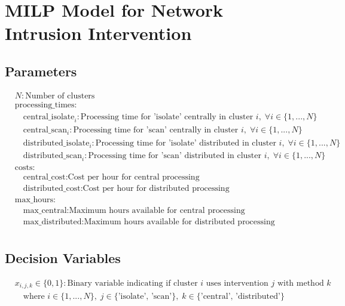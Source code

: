 \documentclass{article}
\begin{document}
\section*{MILP Model for Network Intrusion Intervention}

\subsection*{Parameters}
\begin{align*}
    &N: \text{Number of clusters} \\
    &\text{processing\_times:}\\
    &\quad \text{central\_isolate}_i: \text{Processing time for 'isolate' centrally in cluster } i, \; \forall i \in \{1, ..., N\} \\
    &\quad \text{central\_scan}_i: \text{Processing time for 'scan' centrally in cluster } i, \; \forall i \in \{1, ..., N\} \\
    &\quad \text{distributed\_isolate}_i: \text{Processing time for 'isolate' distributed in cluster } i, \; \forall i \in \{1, ..., N\} \\
    &\quad \text{distributed\_scan}_i: \text{Processing time for 'scan' distributed in cluster } i, \; \forall i \in \{1, ..., N\} \\
    &\text{costs:}\\
    &\quad \text{central\_cost}: \text{Cost per hour for central processing} \\
    &\quad \text{distributed\_cost}: \text{Cost per hour for distributed processing} \\
    &\text{max\_hours:}\\
    &\quad \text{max\_central}: \text{Maximum hours available for central processing} \\
    &\quad \text{max\_distributed}: \text{Maximum hours available for distributed processing} \\
\end{align*}

\subsection*{Decision Variables}
\begin{align*}
    &x_{i,j,k} \in \{0, 1\}: \text{Binary variable indicating if cluster } i \text{ uses intervention } j \text{ with method } k \\
    &\quad \text{where } i \in \{1, ..., N\}, \; j \in \{\text{'isolate', 'scan'}\}, \; k \in \{\text{'central', 'distributed'}\} \\
\end{align*}
\end{document}
